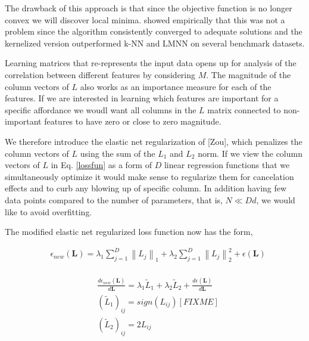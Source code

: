 The drawback of this approach is that since the objective function is no
longer convex we will discover local minima. \cite{Torresani:2006wb}
showed empirically that this was not a problem since the algorithm
consistently converged to adequate solutions and the kernelized version
outperformed k-NN and LMNN on several benchmark datasets.

Learning matrices that re-represents the input data opens up for
analysis of the correlation between different features by considering
\(M\). The magnitude of the column vectors of \(L\) also works as an
importance measure for each of the features. If we are interested in
learning which features are important for a specific affordance we woudl
want all columns in the \(L\) matrix connected to non-important features
to have zero or close to zero magnitude.

We therefore introduce the elastic net regularization of {[}Zou{]},
which penalizes the column vectors of \(L\) using the sum of the \(L_1\)
and \(L_2\) norm. If we view the column vectors of \(L\) in Eq.
\ref{lossfun} as a form of \(D\) linear regression functions that we
simultaneously optimize it would make sense to regularize them for
cancelation effects and to curb any blowing up of specific column. In
addition having few data points compared to the number of parameters,
that is, \(N \ll Dd\), we would like to avoid overfitting.

The modified elastic net regularized loss function now has the form,

\small 

\begin{equation}
\label{lossfun}
\begin{aligned}
& \epsilon_{new}(\mathbf{L}) = \lambda_1 \sum_{j=1}^{D} \left\lVert L_j  \right\rVert_1 + \lambda_2 \sum_{j=1}^{D} \left\lVert L_j  \right\rVert_{2}^{2} +   \epsilon(\mathbf{L}) \\
\end{aligned}
\end{equation}

\begin{equation}
\label{lossfunderivative}
\begin{aligned}
& \frac{d\epsilon_{new}(\mathbf{L})}{d\mathbf{L}} =   \lambda_1  \tilde{L}_1 + \lambda_2  \tilde{L}_2 + \frac{d\epsilon(\mathbf{L})}{d\mathbf{L}} \\
& (\tilde{L}_1)_{ij} = sign(L_{ij}) [FIXME] \\
& (\tilde{L}_2)_{ij} = 2 L_{ij}
\end{aligned}
\end{equation}


